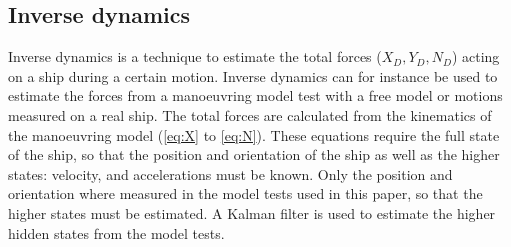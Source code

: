 \subsection{Inverse dynamics}
\label{sec:inverse_dynamics}
Inverse dynamics is a technique to estimate the total forces ($X_D,Y_D,N_D$) acting on a ship during a certain motion. Inverse dynamics can for instance be used to estimate the forces from a manoeuvring model test with a free model or motions measured on a real ship. The total forces are calculated from the kinematics of the manoeuvring model (\autoref{eq:X} to \autoref{eq:N}). These equations require the full state of the ship, so that the position and orientation of the ship as well as the higher states: velocity, and accelerations must be known. 
Only the position and orientation where measured in the model tests used in this paper, so that the higher states must be estimated. A Kalman filter is used to estimate the higher hidden states from the model tests.